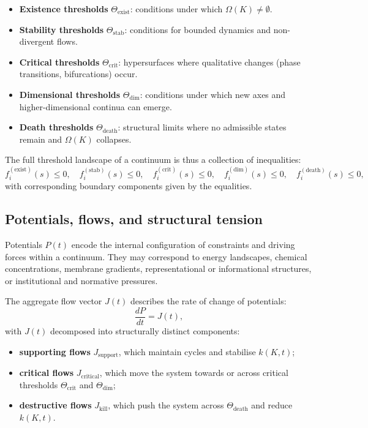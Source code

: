 \begin{itemize}
    \item \textbf{Existence thresholds} \(\Theta_{\mathrm{exist}}\): conditions under which \(\Omega(K)\neq\emptyset\).
    \item \textbf{Stability thresholds} \(\Theta_{\mathrm{stab}}\): conditions for bounded dynamics and non-divergent flows.
    \item \textbf{Critical thresholds} \(\Theta_{\mathrm{crit}}\): hypersurfaces where qualitative changes (phase transitions, bifurcations) occur.
    \item \textbf{Dimensional thresholds} \(\Theta_{\mathrm{dim}}\): conditions under which new axes and higher-dimensional continua can emerge.
    \item \textbf{Death thresholds} \(\Theta_{\mathrm{death}}\): structural limits where no admissible states remain and \(\Omega(K)\) collapses.
\end{itemize}

The full threshold landscape of a continuum is thus a collection of inequalities:
\[
    f_{i}^{(\mathrm{exist})}(s) \le 0,\quad
    f_{i}^{(\mathrm{stab})}(s) \le 0,\quad
    f_{i}^{(\mathrm{crit})}(s) \le 0,\quad
    f_{i}^{(\mathrm{dim})}(s) \le 0,\quad
    f_{i}^{(\mathrm{death})}(s) \le 0,
\]
with corresponding boundary components given by the equalities.

\subsection{Potentials, flows, and structural tension}

Potentials \(P(t)\) encode the internal configuration of constraints and driving forces within a continuum.
They may correspond to energy landscapes, chemical concentrations, membrane gradients, representational or informational structures, or institutional and normative pressures.

The aggregate flow vector \(J(t)\) describes the rate of change of potentials:
\[
    \frac{dP}{dt} = J(t),
\]
with \(J(t)\) decomposed into structurally distinct components:
\begin{itemize}
    \item \textbf{supporting flows} \(J_{\mathrm{support}}\), which maintain cycles and stabilise \(k(K,t)\);
    \item \textbf{critical flows} \(J_{\mathrm{critical}}\), which move the system towards or across critical thresholds \(\Theta_{\mathrm{crit}}\) and \(\Theta_{\mathrm{dim}}\);
    \item \textbf{destructive flows} \(J_{\mathrm{kill}}\), which push the system across \(\Theta_{\mathrm{death}}\) and reduce \(k(K,t)\).
\end{itemize}


